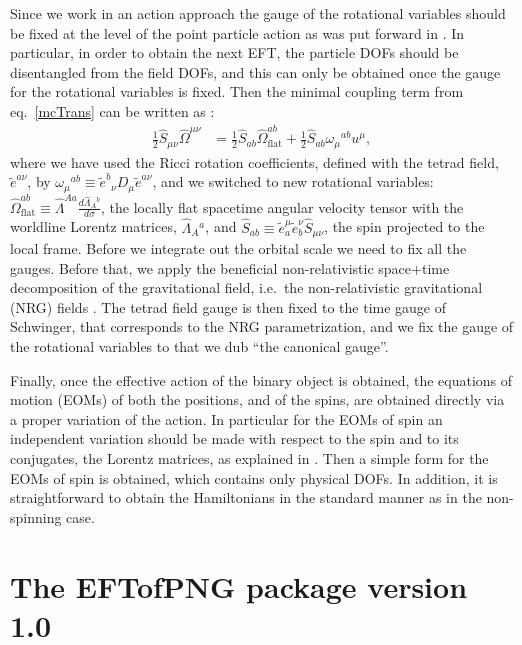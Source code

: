 \documentclass[a4paper,11pt]{article}
\begin{document}
Since we work in an action approach the gauge of the rotational variables should be fixed at 
the level of the point particle action as was put forward in \cite{Levi:2008nh}. In 
particular, in order to obtain the next EFT, the particle DOFs should be disentangled from 
the field DOFs, and this can only be obtained once the gauge for the rotational variables is 
fixed. Then the minimal coupling term from eq.~\eqref{mcTrans} can be written as 
\cite{Levi:2010zu,Levi:2015msa}:
\begin{align} \label{Sfieldsplit}
\frac{1}{2} \hat{S}_{\mu\nu} \hat{\Omega}^{\mu\nu}
&= \frac{1}{2} \hat{S}_{ab} \hat{\Omega}^{ab}_{\text{flat}}
         + \frac{1}{2} \hat{S}_{ab} \omega_{\mu}{}^{ab} u^{\mu},      
\end{align}
where we have used the Ricci rotation coefficients, defined with the tetrad field, 
$\tilde{e}^{a\nu}$, by
$\omega_{\mu}{}^{ab} \equiv \tilde{e}^b{}_{\nu} D_{\mu}\tilde{e}^{a\nu}$,
 and we switched to new rotational variables: $\hat{\Omega}^{ab}_{\text{flat}} 
\equiv\hat{\Lambda}^{Aa} \frac{d \hat{\Lambda}_A{}^b}{d \sigma}$, the locally 
flat spacetime angular velocity tensor with the worldline Lorentz matrices, 
$\hat{\Lambda}_A{}^a$, and 
$\hat{S}_{ab}\equiv\tilde{e}^{\mu}_{a}\tilde{e}^{\nu}_{b}\hat{S}_{\mu\nu}$, the spin 
projected to the local frame. Before we integrate out the orbital scale we need to fix all 
the gauges. Before that, we apply the beneficial non-relativistic space+time decomposition 
of the gravitational field, i.e.~the non-relativistic gravitational (NRG) fields 
\cite{Kol:2007bc, Kol:2010ze}. The tetrad field gauge is then fixed to the time gauge of 
Schwinger, that corresponds to the NRG parametrization, and we fix the gauge of the 
rotational variables to that we dub ``the canonical gauge''. 

Finally, once the effective action of the binary object is obtained, the equations of 
motion (EOMs) of both the positions, and of the spins, are obtained directly via a proper 
variation of the action. In particular for the EOMs of spin an independent variation should 
be made with respect to the spin and to its conjugates, the Lorentz matrices, as explained 
in \cite{Levi:2014sba}. Then a simple form for the EOMs of spin is obtained, which contains 
only physical DOFs. In addition, it is straightforward to obtain the Hamiltonians in the 
standard manner as in the non-spinning case. 


\section{The EFTofPNG package version 1.0}
\label{overview}
 
\end{document}
